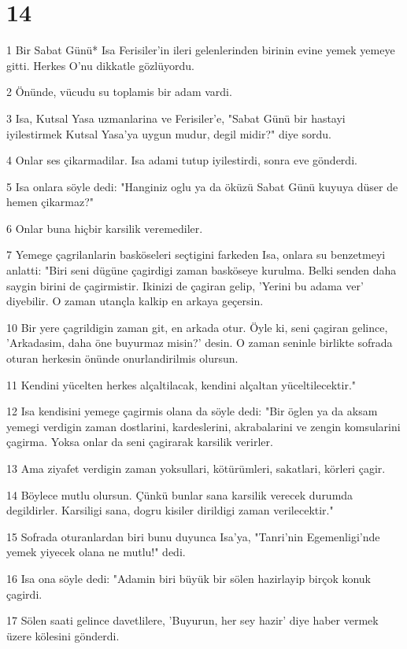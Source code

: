 \chapter{14}

\par 1 Bir Sabat Günü* Isa Ferisiler'in ileri gelenlerinden birinin evine yemek yemeye gitti. Herkes O'nu dikkatle gözlüyordu.
\par 2 Önünde, vücudu su toplamis bir adam vardi.
\par 3 Isa, Kutsal Yasa uzmanlarina ve Ferisiler'e, "Sabat Günü bir hastayi iyilestirmek Kutsal Yasa'ya uygun mudur, degil midir?" diye sordu.
\par 4 Onlar ses çikarmadilar. Isa adami tutup iyilestirdi, sonra eve gönderdi.
\par 5 Isa onlara söyle dedi: "Hanginiz oglu ya da öküzü Sabat Günü kuyuya düser de hemen çikarmaz?"
\par 6 Onlar buna hiçbir karsilik veremediler.
\par 7 Yemege çagrilanlarin basköseleri seçtigini farkeden Isa, onlara su benzetmeyi anlatti: "Biri seni dügüne çagirdigi zaman basköseye kurulma. Belki senden daha saygin birini de çagirmistir. Ikinizi de çagiran gelip, 'Yerini bu adama ver' diyebilir. O zaman utançla kalkip en arkaya geçersin.
\par 10 Bir yere çagrildigin zaman git, en arkada otur. Öyle ki, seni çagiran gelince, 'Arkadasim, daha öne buyurmaz misin?' desin. O zaman seninle birlikte sofrada oturan herkesin önünde onurlandirilmis olursun.
\par 11 Kendini yücelten herkes alçaltilacak, kendini alçaltan yüceltilecektir."
\par 12 Isa kendisini yemege çagirmis olana da söyle dedi: "Bir öglen ya da aksam yemegi verdigin zaman dostlarini, kardeslerini, akrabalarini ve zengin komsularini çagirma. Yoksa onlar da seni çagirarak karsilik verirler.
\par 13 Ama ziyafet verdigin zaman yoksullari, kötürümleri, sakatlari, körleri çagir.
\par 14 Böylece mutlu olursun. Çünkü bunlar sana karsilik verecek durumda degildirler. Karsiligi sana, dogru kisiler dirildigi zaman verilecektir."
\par 15 Sofrada oturanlardan biri bunu duyunca Isa'ya, "Tanri'nin Egemenligi'nde yemek yiyecek olana ne mutlu!" dedi.
\par 16 Isa ona söyle dedi: "Adamin biri büyük bir sölen hazirlayip birçok konuk çagirdi.
\par 17 Sölen saati gelince davetlilere, 'Buyurun, her sey hazir' diye haber vermek üzere kölesini gönderdi.
